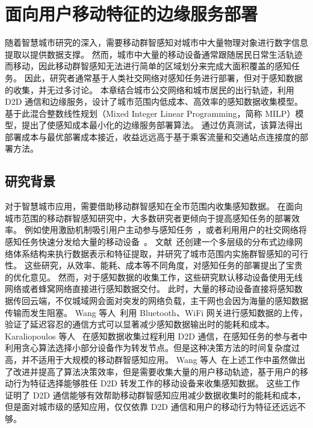 \chapter{面向用户移动特征的边缘服务部署}

随着智慧城市研究的深入，需要移动群智感知对城市中大量物理对象进行数字信息提取以提供数据支撑。
然而，城市中大量的移动设备通常跟随居民日常生活轨迹而移动，因此移动群智感知无法进行简单的区域划分来完成大面积覆盖的感知任务。
因此，研究者通常基于人类社交网络对感知任务进行部署，但对于感知数据的收集，并无过多讨论。
本章结合城市公交网络和城市居民的出行轨迹，利用 D2D 通信和边缘服务，设计了城市范围内低成本、高效率的感知数据收集模型。
基于此混合整数线性规划（Mixed Integer Linear Programming，简称 MILP）模型，提出了使感知成本最小化的边缘服务部署算法。
通过仿真测试，该算法得出部署成本与最优部署成本接近，收益远远高于基于乘客流量和交通站点连接度的部署方法。

\section{研究背景}

对于智慧城市应用，需要借助移动群智感知在全市范围内收集感知数据。
在面向城市范围的移动群智感知研究中，大多数研究者更倾向于提高感知任务的部署效率。
例如使用激励机制吸引用户主动参与感知任务~\cite{CNKI:JiaChaopeng, CNKI:WuMCSIncentive, jiyubianyuanjisuangongyecaiji}，或者利用用户的社交网络将感知任务快速分发给大量的移动设备~\cite{Cnki:Yu2018}。
文献~\cite{DBLP:journals/tii/TangCHPWHY17}还创建一个多层级的分布式边缘网络体系结构来执行数据表示和特征提取，并研究了城市范围内实施群智感知的可行性。
这些研究，从效率、能耗、成本等不同角度，对感知任务的部署提出了宝贵的优化意见。
然而，对于感知数据的收集工作，这些研究默认移动设备使用无线网络或者蜂窝网络直接进行感知数据交付。
此时，大量的移动设备直接将感知数据传回云端，不仅城域网会面对突发的网络负载，主干网也会因为海量的感知数据传输而发生阻塞。
Wang 等人~\cite{DBLP:conf/huc/WangZX13}利用 Bluetooth、WiFi 网关进行感知数据的上传，验证了延迟容忍的通信方式可以显著减少感知数据输出时的能耗和成本。
Karaliopoulos 等人~\cite{DBLP:conf/infocom/KaraliopoulosTK15} 在感知数据收集过程利用 D2D 通信，在感知任务的参与者中利用贪心算法选择小部分设备作为转发节点。但是这种决策方法的时间复杂度过高，并不适用于大规模的移动群智感知应用。
Wang 等人~\cite{DBLP:journals/puc/WangLL17}在上述工作中虽然做出了改进并提高了算法决策效率，但是需要收集大量的用户移动轨迹，基于用户的移动行为特征选择能够胜任 D2D 转发工作的移动设备来收集感知数据。
这些工作证明了 D2D 通信能够有效帮助移动群智感知应用减少数据收集时的能耗和成本，但是面对城市级的感知应用，仅仅依靠 D2D 通信和用户的移动行为特征还远远不够。

